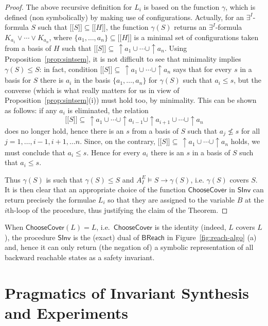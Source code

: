 \documentclass{LMCS}
\newcommand{\mywidehat}[1]{\ensuremath{\lbrack\!\lbrack #1 \rbrack\!\rbrack}}
\theoremstyle{plain}\newtheorem{assumption}[thm]{Assumption}
\theoremstyle{plain}\newtheorem{proposition}[thm]{Proposition}
\theoremstyle{plain}\newtheorem{property}[thm]{Property}
\theoremstyle{plain}\newtheorem{example}[thm]{Example}
\theoremstyle{plain}\newtheorem{claim}[thm]{Claim}
\theoremstyle{plain}\newtheorem{lemma}[thm]{Lemma}
\begin{document}
\begin{proof}
  The above recursive definition for $L_i$ is based on the function
  $\gamma$, which is defined (non symbolically) by making use of
  configurations.  Actually, for an $\exists^I$-formula $S$ such that
  $\mywidehat{S}\subseteq \mywidehat{H}$, the function $\gamma(S)$
  returns an $\exists^I$-formula $K_{a_1}\vee\cdots\vee K_{a_n}$,
  where $\{a_1, \dots, a_n\}\subseteq \mywidehat{H}$ is a minimal set
  of configurations taken from a basis of $H$ such that
  $\mywidehat{S}\subseteq\,\uparrow\! a_1\cup \cdots \cup \uparrow\!
  a_n$. Using Proposition~\ref{prop:sintsem}, it is not difficult to
  see that minimality implies $\gamma(S)\leq S$: in fact, condition
  $\mywidehat{S}\subseteq\,\uparrow\! a_1\cup \cdots \cup \uparrow\!
  a_n$ says that for every $s$ in a basis for $S$ there is $a_i$ in
  the basis $\{a_1, \dots, a_n\}$ for $\gamma(S)$ such that $a_i\leq
  s$, but the converse (which is what really matters for us in view of
  Proposition~\ref{prop:sintsem}(i)) must hold too, by
  minimality. This can be shown as follows: if any $a_i$ is
  eliminated, the relation $$\mywidehat{S}\subseteq\,\uparrow\!
  a_1\cup \cdots \cup \uparrow\! a_{i-1}\cup \uparrow\! a_{i+1}\cup
  \cdots\cup\uparrow\!  a_n$$ does no longer hold, hence there is an
  $s$ from a basis of $S$ such that $a_j\not\leq s$ for all $j=1,
  \dots, i-1, i+1, \dots n$. Since, on the contrary,
  $\mywidehat{S}\subseteq\,\uparrow\! a_1\cup \cdots \cup \uparrow\!
  a_n$ holds, we must conclude that $a_i\leq s$. Hence for every $a_i$
  there is an $s$ in a basis of $S$ such that $a_i\leq s$.

  Thus $\gamma(S)$ is such that $\gamma(S)\leq S$ and $A^E_I\models
  S\to \gamma(S)$, i.e. $\gamma(S)$ covers $S$.
It is then clear that an appropriate choice of the function
  $\mathsf{ChooseCover}$ in $\mathsf{SInv}$ can return precisely the
  formulae $L_i$ so that they are assigned to the variable $B$ at the
  $i$th-loop of the procedure, thus justifying the claim of the
  Theorem.
\end{proof}
When $\mathsf{ChooseCover}(L)=L$, i.e.\ $\mathsf{ChooseCover}$ is the
identity (indeed, $L$ covers $L$), the procedure $\mathsf{SInv}$ is
the (exact) dual of $\mathsf{BReach}$ in Figure~\ref{fig:reach-algo}
(a) and, hence it can only return (the negation of) a symbolic
representation of all backward reachable states as a safety invariant.


\section{Pragmatics of Invariant Synthesis and Experiments}
\label{sec:implementation}
\end{document}

